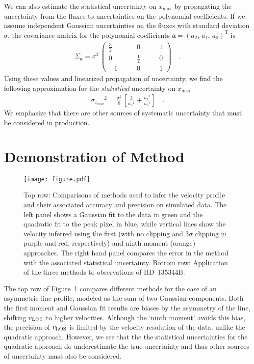 \documentclass[rnaas]{aastex62}
\newcommand{\T}{\ensuremath{\mathrm{T}}}
\newcommand{\bvec}[1]{{\ensuremath{\boldsymbol{#1}}}}
\begin{document}
We can also estimate the statistical uncertainty on $x_\mathrm{max}$ by
propagating the uncertainty from the fluxes to uncertainties on the polynomial
coefficients.
If we assume independent Gaussian uncertainties on the fluxes with standard
deviation $\sigma$, the covariance matrix for the polynomial coefficients
$\bvec{a} = {(a_2,\,a_1,\,a_0)}^\T$ is
\begin{eqnarray}
\Sigma_\bvec{a} = \sigma^2\,\left(\begin{array}{ccc}
\frac{3}{2} \quad & \quad 0 \quad &\quad 1 \\
0\quad &\quad \frac{1}{2}\quad &\quad 0 \\
-1\quad &\quad 0\quad &\quad 1
\end{array}\right)\quad.
\end{eqnarray}
Using these values and linearized propagation of uncertainty, we find the
following approximation for the \emph{statistical} uncertainty on
$x_\mathrm{max}$
\begin{eqnarray}
{\sigma_{x_\mathrm{max}}}^2 = \frac{\sigma^2}{8}\,\left[
    \frac{3}{{a_2}^2} + \frac{{a_1}^2}{{a_2}^4}
\right]\quad.
\end{eqnarray}
We emphasize that there are other sources of systematic uncertainty that must
be considered in production.

\section{Demonstration of Method}

\begin{figure}[htbp]
\centering
\texttt{[image: figure.pdf]}
\caption{Top row: Comparisons of methods used to infer the velocity profile and their associated accuracy and precision on simulated data. The left panel shows a Gaussian fit to the data in green and the quadratic fit to the peak pixel in blue, while vertical lines show the velocity inferred using the first (with no clipping and $3\sigma$ clipping in purple and red, respectively) and ninth moment (orange) approaches. The right hand panel compares the error in the method with the associated statistical uncertainty. Bottom row: Application of the three methods to observations of HD~135344B. \label{figure}}
\end{figure}

The top row of Figure~\ref{figure} compares different methods for the case of an asymmetric line profile, modeled as the sum of two Gaussian components. Both the first moment and Gaussian fit results are biases by the asymmetry of the line, shifting $v_{\rm LOS}$ to higher velocities. Although the `ninth moment' avoids this bias, the precision of $v_{\rm LOS}$ is limited by the velocity resolution of the data, unlike the quadratic approach. However, we see that the the statistical uncertainties for the quadratic approach do underestimate the true uncertainty and thus other sources of uncertainty must also be considered.
\end{document}
